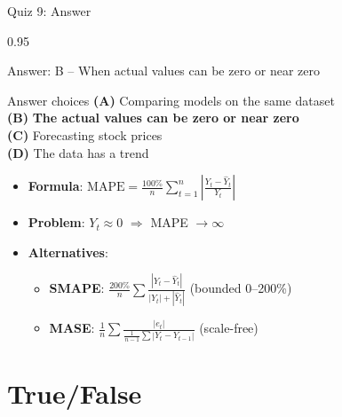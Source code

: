 \documentclass[9pt, aspectratio=169, t]{beamer}
\begin{document}
\begin{frame}{Quiz 9: Answer}
    \begin{cminipage}{0.95\textwidth}
    \begin{exampleblock}{Answer: B -- When actual values can be zero or near zero}
    {\footnotesize
    \begin{block}{Answer choices}
        \textcolor{MainBlue}{\textbf{(A)}} Comparing models on the same dataset \incorrect\\[2pt]
        \textcolor{MainBlue}{\textbf{(B)}} \textbf{\textcolor{Forest}{The actual values can be zero or near zero}} \correct\\[2pt]
        \textcolor{MainBlue}{\textbf{(C)}} Forecasting stock prices \incorrect\\[2pt]
        \textcolor{MainBlue}{\textbf{(D)}} The data has a trend \incorrect
    \end{block}

        \vspace{0.1cm}

        \begin{itemize}\setlength{\itemsep}{1pt}
            \item \textbf{Formula}: $\text{MAPE} = \frac{100\%}{n}\sum_{t=1}^{n}\left|\frac{Y_t - \hat{Y}_t}{Y_t}\right|$
            \item \textbf{Problem}: $Y_t \approx 0$ $\Rightarrow$ MAPE $\to \infty$
            \item \textbf{Alternatives}:
                \begin{itemize}\setlength{\itemsep}{0pt}
                    \item \textbf{SMAPE}: $\frac{200\%}{n}\sum\frac{|Y_t - \hat{Y}_t|}{|Y_t| + |\hat{Y}_t|}$ (bounded 0--200\%)
                    \item \textbf{MASE}: $\frac{1}{n}\sum\frac{|e_t|}{\frac{1}{n-1}\sum|Y_t - Y_{t-1}|}$ (scale-free)
                \end{itemize}
        \end{itemize}
    }
    \end{exampleblock}

    \end{cminipage}
\end{frame}

\section{True/False}
\end{document}
